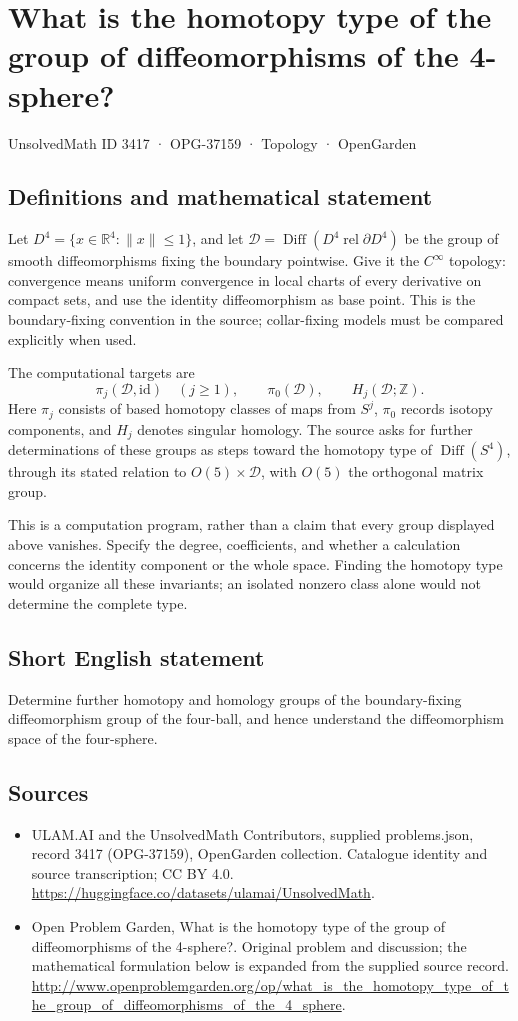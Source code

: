 \documentclass[11pt,a4paper]{article}
\begin{document}
\section*{What is the homotopy type of the group of diffeomorphisms of the 4-sphere?}\label{3417}
{\small UnsolvedMath ID 3417 · OPG-37159 · Topology · OpenGarden}
\subsection{Definitions and mathematical statement}
Let $D^4=\{x\in\mathbb R^4:\|x\|\le1\}$, and let
$\mathcal D=\operatorname{Diff}(D^4\operatorname{ rel}\partial D^4)$
be the group of smooth diffeomorphisms fixing the boundary pointwise.
Give it the $C^\infty$ topology: convergence means uniform convergence
in local charts of every derivative on compact sets, and use the
identity diffeomorphism as base point. This is the boundary-fixing
convention in the source; collar-fixing models must be compared
explicitly when used.

The computational targets are
\[
                 \pi_j(\mathcal D,\mathrm{id})\quad(j\ge1),
       \qquad \pi_0(\mathcal D),\qquad H_j(\mathcal D;\mathbb Z).
\]
Here $\pi_j$ consists of based homotopy classes of maps from $S^j$,
$\pi_0$ records isotopy components, and $H_j$ denotes singular homology.
The source asks for further determinations of these groups as steps
toward the homotopy type of $\operatorname{Diff}(S^4)$, through its
stated relation to $O(5)\times\mathcal D$, with $O(5)$ the orthogonal
matrix group.

This is a computation program, rather than a claim that every group
displayed above vanishes. Specify the degree, coefficients, and whether
a calculation concerns the identity component or the whole space.
Finding the homotopy type would organize all these invariants; an
isolated nonzero class alone would not determine the complete type.
\subsection{Short English statement}
Determine further homotopy and homology groups of the boundary-fixing diffeomorphism group of the four-ball, and hence understand the diffeomorphism space of the four-sphere.
\subsection{Sources}
\begin{itemize}
\item[S1] ULAM.AI and the UnsolvedMath Contributors, supplied problems.json, record 3417 (OPG-37159), OpenGarden collection. Catalogue identity and source transcription; CC BY 4.0.
\url{https://huggingface.co/datasets/ulamai/UnsolvedMath}.
\item[S2] Open Problem Garden, What is the homotopy type of the group of diffeomorphisms of the 4-sphere?. Original problem and discussion; the mathematical formulation below is expanded from the supplied source record.
\url{http://www.openproblemgarden.org/op/what_is_the_homotopy_type_of_the_group_of_diffeomorphisms_of_the_4_sphere}.
\end{itemize}
\end{document}
